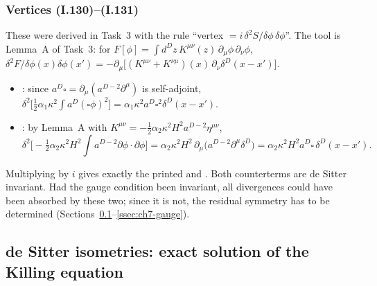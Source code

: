 \subsubsection{Vertices (I.130)--(I.131)}
\tD{}
These were derived in Task~3 with the rule ``vertex $=i\,\delta^2S/\delta\phi\,\delta\phi$''.
The tool is Lemma~A of Task~3: for $F[\phi]=\int d^Dz\,K^{\mu\nu}(z)\,\partial_\mu\phi\,\partial_\nu\phi$,
$\delta^2F/\delta\phi(x)\delta\phi(x')=-\partial_\mu\big[(K^{\mu\nu}+K^{\nu\mu})(x)\,\partial_\nu\delta^D(x-x')\big]$.
\begin{itemize}[leftmargin=14pt]
\item {}: since $a^D\square=\partial_\mu(a^{D-2}\partial^\mu)$ is self-adjoint,
$\delta^2\big[\tfrac12\alpha_1\kappa^2\!\int a^D(\square\phi)^2\big]=\alpha_1\kappa^2a^D\square^2\delta^D(x-x')$.
\item {}: by Lemma~A with $K^{\mu\nu}=-\tfrac12\alpha_2\kappa^2H^2a^{D-2}\eta^{\mu\nu}$,
\begin{equation*}
\delta^2\Big[-\tfrac12\alpha_2\kappa^2H^2\!\int a^{D-2}\partial\phi\cdot\partial\phi\Big]=\alpha_2\kappa^2H^2\,\partial_\mu\big(a^{D-2}\partial^\mu\delta^D\big)=\alpha_2\kappa^2H^2a^D\square\,\delta^D(x-x').
\end{equation*}
\end{itemize}
Multiplying by $i$ gives exactly the printed  and . \checkmark{}
Both counterterms are de Sitter invariant.
Had the gauge condition  been invariant, all divergences could have been absorbed by these two;
since it is not, the residual symmetry has to be determined (Sections~\ref{ssec:ch7-killing}--\ref{ssec:ch7-gauge}).

\subsection{de Sitter isometries: exact solution of the Killing equation}
\label{ssec:ch7-killing}

